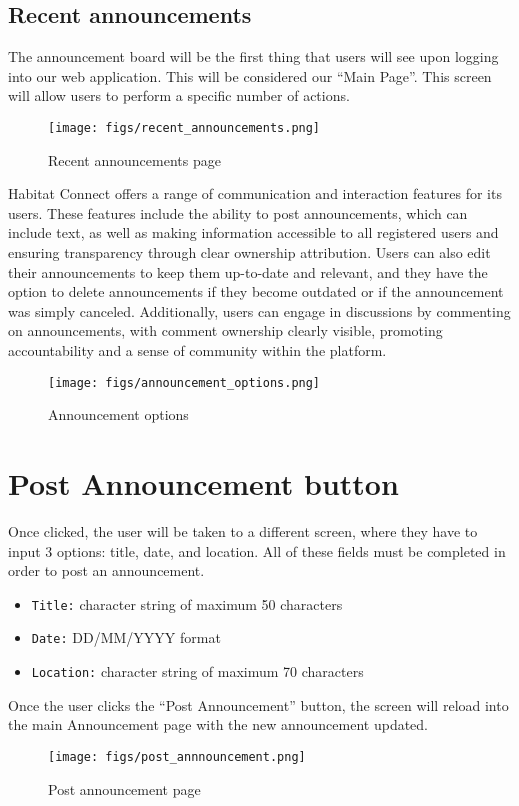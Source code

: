 \documentclass[conference]{IEEEtran}
\begin{document}
\subsection{Recent announcements}
The announcement board will be the first thing that users will see upon logging into our web application. This will be considered our “Main Page”. This screen will allow users to perform a specific number of actions.
    \begin{figure}[H]
    \centering
    \texttt{[image: figs/recent\_announcements.png]}
    \caption{Recent announcements page}
    \label{fig:Recent announcements page}
    \end{figure}
Habitat Connect offers a range of communication and interaction features for its users. These features include the ability to post announcements, which can include text, as well as making information accessible to all registered users and ensuring transparency through clear ownership attribution. Users can also edit their announcements to keep them up-to-date and relevant, and they have the option to delete announcements if they become outdated or if the announcement was simply canceled. Additionally, users can engage in discussions by commenting on announcements, with comment ownership clearly visible, promoting accountability and a sense of community within the platform.
    \begin{figure}[H]
    \centering
    \texttt{[image: figs/announcement\_options.png]}
    \caption{Announcement options}
    \label{fig:Announcement options}
    \end{figure}

\section*{Post Announcement button}
Once clicked, the user will be taken to a different screen, where they have to input 3 options: title, date, and location. All of these fields must be completed in order to post an announcement. 
\begin{itemize}
    \item \texttt{Title:} character string of maximum 50 characters
    \item \texttt{Date:} DD/MM/YYYY format
    \item \texttt{Location:} character string  of maximum 70 characters
\end{itemize}
Once the user clicks the “Post Announcement” button, the screen will reload into the main Announcement page with the new announcement updated.
    \begin{figure}[H]
    \centering
    \texttt{[image: figs/post\_annnouncement.png]}
    \caption{Post announcement page}
    \label{fig:Post announcement page}
    \end{figure}
\end{document}
